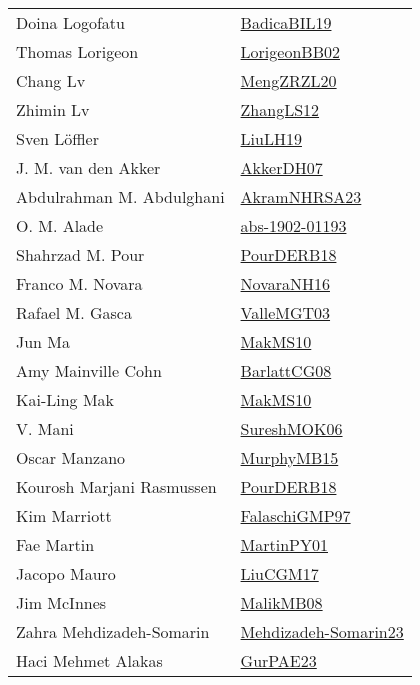 {\begin{longtable}{p{4cm}p{20cm}}
Doina Logofatu & \href{}{BadicaBIL19}\cite{BadicaBIL19} \\
Thomas Lorigeon & \href{}{LorigeonBB02}\cite{LorigeonBB02} \\
Chang Lv & \href{articles/MengZRZL20.pdf}{MengZRZL20}\cite{MengZRZL20} \\
Zhimin Lv & \href{papers/ZhangLS12.pdf}{ZhangLS12}\cite{ZhangLS12} \\
Sven L{\"{o}}ffler & \href{papers/LiuLH19.pdf}{LiuLH19}\cite{LiuLH19} \\
J. M. van den Akker & \href{papers/AkkerDH07.pdf}{AkkerDH07}\cite{AkkerDH07} \\
Abdulrahman M. Abdulghani & \href{articles/AkramNHRSA23.pdf}{AkramNHRSA23}\cite{AkramNHRSA23} \\
O. M. Alade & \href{articles/abs-1902-01193.pdf}{abs-1902-01193}\cite{abs-1902-01193} \\
Shahrzad M. Pour & \href{articles/PourDERB18.pdf}{PourDERB18}\cite{PourDERB18} \\
Franco M. Novara & \href{articles/NovaraNH16.pdf}{NovaraNH16}\cite{NovaraNH16} \\
Rafael M. Gasca & \href{papers/ValleMGT03.pdf}{ValleMGT03}\cite{ValleMGT03} \\
Jun Ma & \href{papers/MakMS10.pdf}{MakMS10}\cite{MakMS10} \\
Amy Mainville Cohn & \href{papers/BarlattCG08.pdf}{BarlattCG08}\cite{BarlattCG08} \\
Kai{-}Ling Mak & \href{papers/MakMS10.pdf}{MakMS10}\cite{MakMS10} \\
V. Mani & \href{}{SureshMOK06}\cite{SureshMOK06} \\
Oscar Manzano & \href{papers/MurphyMB15.pdf}{MurphyMB15}\cite{MurphyMB15} \\
Kourosh Marjani Rasmussen & \href{articles/PourDERB18.pdf}{PourDERB18}\cite{PourDERB18} \\
Kim Marriott & \href{articles/FalaschiGMP97.pdf}{FalaschiGMP97}\cite{FalaschiGMP97} \\
Fae Martin & \href{articles/MartinPY01.pdf}{MartinPY01}\cite{MartinPY01} \\
Jacopo Mauro & \href{papers/LiuCGM17.pdf}{LiuCGM17}\cite{LiuCGM17} \\
Jim McInnes & \href{}{MalikMB08}\cite{MalikMB08} \\
Zahra Mehdizadeh{-}Somarin & \href{papers/Mehdizadeh-Somarin23.pdf}{Mehdizadeh-Somarin23}\cite{Mehdizadeh-Somarin23} \\
Haci Mehmet Alakas & \href{articles/GurPAE23.pdf}{GurPAE23}\cite{GurPAE23} \\

\end{longtable}}
